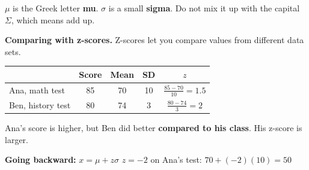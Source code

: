 \documentclass[11pt]{article}
\begin{document}
\begin{center}\end{center}

{\small $\mu$ is the Greek letter \textbf{mu}. $\sigma$ is a small \textbf{sigma}. Do not mix it up with the capital $\Sigma$, which means add up.}

\vspace{0.8em}
\textbf{Comparing with z-scores.} Z-scores let you compare values from different data sets.

\vspace{0.3em}
\begin{tabular}{|l|c|c|c|c|}\hline
 & Score & Mean & SD & $z$ \\ \hline
Ana, math test & 85 & 70 & 10 & $\frac{85 - 70}{10} = 1.5$ \\[0.3em] \hline
Ben, history test & 80 & 74 & 3 & $\frac{80 - 74}{3} = 2$ \\[0.3em] \hline
\end{tabular}

\vspace{0.4em}
Ana's score is higher, but Ben did better \textbf{compared to his class}. His z-score is larger.

\vspace{0.8em}
\textbf{Going backward:} \quad $x = \mu + z\sigma$ \qquad
$z = -2$ on Ana's test: \; $70 + (-2)(10) = 50$

\partner
\end{document}
